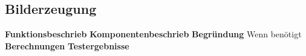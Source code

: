 \subsection{Bilderzeugung}

\textbf{Funktionsbeschrieb}
\textbf{Komponentenbeschrieb}
\textbf{Begründung}
Wenn benötigt
\textbf{Berechnungen}
\textbf{Testergebnisse}
